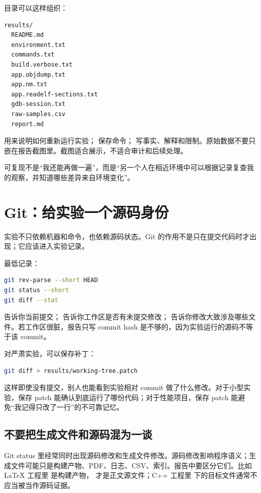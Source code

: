 目录可以这样组织：

\begin{lstlisting}
results/
  README.md
  environment.txt
  commands.txt
  build.verbose.txt
  app.objdump.txt
  app.nm.txt
  app.readelf-sections.txt
  gdb-session.txt
  raw-samples.csv
  report.md
\end{lstlisting}

 用来说明如何重新运行实验； 保存命令； 写事实、解释和限制。原始数据不要只嵌在报告截图里。截图适合展示，不适合审计和后续处理。

\begin{keyidea}
可复现不是“我还能再做一遍”，而是“另一个人在相近环境中可以根据记录复查我的观察，并知道哪些差异来自环境变化”。
\end{keyidea}

\section{Git：给实验一个源码身份}

实验不只依赖机器和命令，也依赖源码状态。Git 的作用不是只在提交代码时才出现；它应该进入实验记录。

最低记录：

\begin{lstlisting}[language=bash]
git rev-parse --short HEAD
git status --short
git diff --stat
\end{lstlisting}

 告诉你当前提交； 告诉你工作区是否有未提交修改； 告诉你修改大致涉及哪些文件。若工作区很脏，报告只写 commit hash 是不够的，因为实验运行的源码不等于该 commit。

对严肃实验，可以保存补丁：

\begin{lstlisting}[language=bash]
git diff > results/working-tree.patch
\end{lstlisting}

这样即使没有提交，别人也能看到实验相对 commit 做了什么修改。对于小型实验，保存 patch 能确认到底运行了哪份代码；对于性能项目，保存 patch 能避免“我记得只改了一行”的不可靠记忆。

\subsection{不要把生成文件和源码混为一谈}

Git status 里经常同时出现源码修改和生成文件修改。源码修改影响程序语义；生成文件可能只是构建产物、PDF、日志、CSV、索引。报告中要区分它们。比如 LaTeX 工程里  是构建产物， 才是正文源文件；C++ 工程里  下的目标文件通常不应当被当作源码证据。

